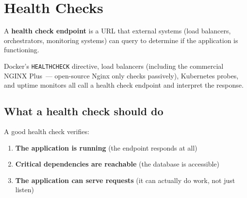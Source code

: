 \setcounter{section}{2}
\section{Health Checks}\label{35-observability:353-health-checks}

A \textbf{health check endpoint} is a URL that external systems (load balancers, orchestrators, monitoring systems) can query to determine if the application is functioning.

Docker's \texttt{HEALTHCHECK} directive, load balancers (including the commercial NGINX Plus~--- open-source Nginx only checks passively), Kubernetes probes, and uptime monitors all call a health check endpoint and interpret the response.

\subsection*{What a health check should do}\label{35-observability:what-a-health-check-should-do}

A good health check verifies:

\begin{enumerate}
\def\labelenumi{\arabic{enumi}.}
\tightlist
\item
  \textbf{The application is running} (the endpoint responds at all)
\item
  \textbf{Critical dependencies are reachable} (the database is accessible)
\item
  \textbf{The application can serve requests} (it can actually do work, not just listen)
\end{enumerate}

